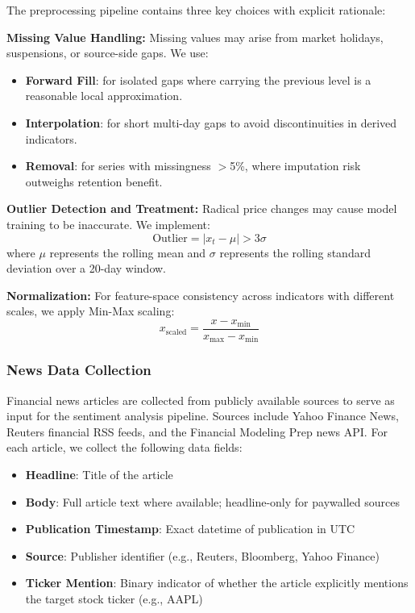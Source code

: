 The preprocessing pipeline contains three key choices with explicit rationale:

\textbf{Missing Value Handling:}
Missing values may arise from market holidays, suspensions, or source-side gaps. We use:
\begin{itemize}
    \item \textbf{Forward Fill}: for isolated gaps where carrying the previous level is a reasonable local approximation.
    \item \textbf{Interpolation}: for short multi-day gaps to avoid discontinuities in derived indicators.
    \item \textbf{Removal}: for series with missingness $>$5\%, where imputation risk outweighs retention benefit.
\end{itemize}

\textbf{Outlier Detection and Treatment:}
Radical price changes may cause model training to be inaccurate. We implement:
\begin{equation}
\text{Outlier} = |x_t - \mu| > 3\sigma
\end{equation}
where $\mu$ represents the rolling mean and $\sigma$ represents the rolling standard deviation over a 20-day window.

\textbf{Normalization:}
For feature-space consistency across indicators with different scales, we apply Min-Max scaling:
\begin{equation}
x_{\text{scaled}} = \frac{x - x_{\min}}{x_{\max} - x_{\min}}
\end{equation}

\subsubsection{News Data Collection}

Financial news articles are collected from publicly available sources to serve as input for the sentiment analysis pipeline. Sources include Yahoo Finance News, Reuters financial RSS feeds, and the Financial Modeling Prep news API. For each article, we collect the following data fields:

\begin{itemize}
    \item \textbf{Headline}: Title of the article
    \item \textbf{Body}: Full article text where available; headline-only for paywalled sources
    \item \textbf{Publication Timestamp}: Exact datetime of publication in UTC
    \item \textbf{Source}: Publisher identifier (e.g., Reuters, Bloomberg, Yahoo Finance)
    \item \textbf{Ticker Mention}: Binary indicator of whether the article explicitly mentions the target stock ticker (e.g., AAPL)
\end{itemize}

